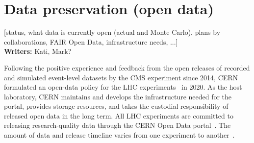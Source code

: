 \documentclass[11pt]{article}
\begin{document}
\section{Data preservation (open data)}
\label{data-preservation}

[status, what data is currently open (actual and Monte Carlo), plans by collaborations, FAIR Open Data, infrastructure needs, ...]\\

\noindent\textbf{Writers:} Kati, Mark?



Following the positive experience and feedback from the open releases of recorded and simulated event-level datasets by the CMS experiment since 2014, CERN formulated an open-data policy for the LHC experiments~\cite{cern-data-policy} in 2020. As the host laboratory, CERN maintains and develops the infrastructure needed for the portal, provides storage resources, and takes the custodial responsibility of released open data in the long term. All LHC experiments are committed to releasing research-quality data through the CERN Open Data portal~\cite{CODP}. The amount of data and release timeline varies from one experiment to another~\cite{cern-data-policy,cern-open-data-privacy-policy,cms-open-data-policy,atlas-open-data-policy,lhcb-open-data-policy,alice-open-data-policy}. 
\end{document}
